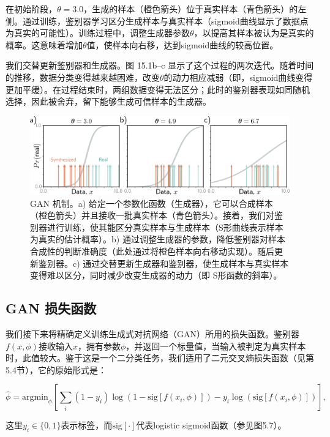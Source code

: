 在初始阶段，\(\theta = 3.0\)，生成的样本（橙色箭头）位于真实样本（青色箭头）的左侧。通过训练，鉴别器学习区分生成样本与真实样本（sigmoid曲线显示了数据点为真实的可能性）。训练过程中，调整生成器参数\(\theta\)，以提高其样本被认为是真实的概率。这意味着增加\(\theta\)值，使样本向右移，达到sigmoid曲线的较高位置。

我们交替更新鉴别器和生成器。图 15.1b–c 显示了这个过程的两次迭代。随着时间的推移，数据分类变得越来越困难，改变\(\theta\)的动力相应减弱（即，sigmoid曲线变得更加平缓）。在过程结束时，两组数据变得无法区分；此时的鉴别器表现如同随机选择，因此被舍弃，留下能够生成可信样本的生成器。

\begin{figure}[ht!]
\centering
\includegraphics[width=0.7\linewidth]{png/chapter15/GanGaussMotivation.png}
\caption{GAN 机制。a) 给定一个参数化函数（生成器），它可以合成样本（橙色箭头）并且接收一批真实样本（青色箭头）。接着，我们对鉴别器进行训练，使其能区分真实样本与生成样本（S形曲线表示样本为真实的估计概率）。b) 通过调整生成器的参数，降低鉴别器对样本合成性的判断准确度（此处通过将橙色样本向右移动实现）。随后更新鉴别器。c) 通过交替更新生成器和鉴别器，使生成样本与真实样本变得难以区分，同时减少改变生成器的动力（即 S形函数的斜率）。}
\end{figure}



\subsection{GAN 损失函数}
我们接下来将精确定义训练生成式对抗网络（GAN）所用的损失函数。鉴别器\(f(x, \phi)\)接收输入\(x\)，拥有参数\(\phi\)，并返回一个标量值，当输入被判定为真实样本时，此值较大。鉴于这是一个二分类任务，我们适用了二元交叉熵损失函数（见第5.4节），它的原始形式是：

\begin{equation}
\hat{\phi} = \text{argmin}_{\phi} \left[ \sum_i (1 - y_i) \log \left( 1 - \text{sig}[f(x_i, \phi)] \right) - y_i \log \left( \text{sig}[f(x_i, \phi)] \right) \right], 
\end{equation}

这里\(y_i \in \{0, 1\}\)表示标签，而\(\text{sig}[\cdot]\)代表logistic sigmoid函数（参见图5.7）。

